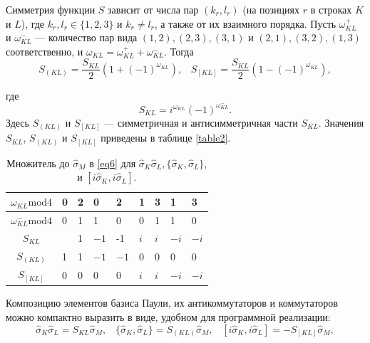 \documentclass[a4paper]{report}
\begin{document}
Симметрия функции ${S}$ зависит от числа пар ${(k_r, l_r)}$ (на позициях ${r}$ в строках ${K}$ и ${L}$), где ${k_r, l_r \in \{1,2,3\}}$ и ${k_r \neq l_r}$, а также от их взаимного порядка. Пусть ${\omega^+_{KL}}$ и ${\omega^-_{KL}}$ — количество пар вида ${(1,2),(2,3),(3,1)}$ и ${(2,1),(3,2),(1,3)}$ соответственно, и ${\omega_{KL} = \omega^+_{KL} + \omega^-_{KL}}$. Тогда
\begin{equation}\label{eq5}
    S_{(KL)} = \frac{S_{KL}}{2}\left(1 + (-1)^{\omega_{KL}}\right),\;\;\;
    S_{[KL]} = \frac{S_{KL}}{2}\left(1 - (-1)^{\omega_{KL}}\right),
\end{equation}

где $$S_{KL} = i^{\omega_{KL}}(-1)^{\omega^-_{KL}}.$$
Здесь ${S_{(KL)}}$ и ${S_{[KL]}}$ — симметричная и антисимметричная части ${S_{KL}}$. Значения ${S_{KL}}$, ${S_{(KL)}}$ и ${S_{[KL]}}$ приведены в таблице \ref{table2}.

\begin{table}[h!]
    \centering
    \begin{tabular}{ | c | P{1cm} | P{1cm} | P{1cm} | P{1cm} | P{1cm} | P{1cm} | P{1cm} | P{1cm} | }
        \hline
        ${\omega_{KL}\mathrm{mod4}}$     & 0 & 2 & 0      & 2      & 1     & 3     & 1      & 3      \\
        \hline
        ${\omega_{KL}^{-}\mathrm{mod4}}$ & 0 & 1 & 1      & 0      & 0     & 1     & 1      & 0      \\
        \hline\hline
        ${S_{KL}}$                       &   & 1 & ${-1}$ & -1     & ${i}$ & ${i}$ & ${-i}$ & ${-i}$ \\
        \hline
        ${S_{(KL)}}$                     & 1 & 1 & ${-1}$ & ${-1}$ & 0     & 0     & 0      & 0      \\
        \hline
        ${S_{[KL]}}$                     & 0 & 0 & 0      & 0      & ${i}$ & ${i}$ & ${-i}$ & ${-i}$ \\
        \hline
    \end{tabular}
    \caption{Множитель до ${\hat{\sigma}_M}$ в \eqref{eq6} для ${\hat{\sigma}_K\hat{\sigma}_L,\{\hat{\sigma}_K,\hat{\sigma}_L\}}$, и ${[i\hat{\sigma}_K,i\hat{\sigma}_L]}$.}\label{table1}
\end{table}

Композицию элементов базиса Паули, их антикоммутаторов и коммутаторов можно компактно выразить в виде, удобном для программной реализации:
\begin{equation}\label{eq6}
    \hat{\sigma}_K\hat{\sigma}_L = S_{KL}\hat{\sigma}_M,\;\;\;
    \{\hat{\sigma}_K, \hat{\sigma}_L\} = S_{(KL)}\hat{\sigma}_M,\;\;\;
    [i\hat{\sigma}_K, i\hat{\sigma}_L] = -S_{[KL]}\hat{\sigma}_M,
\end{equation}
\end{document}

